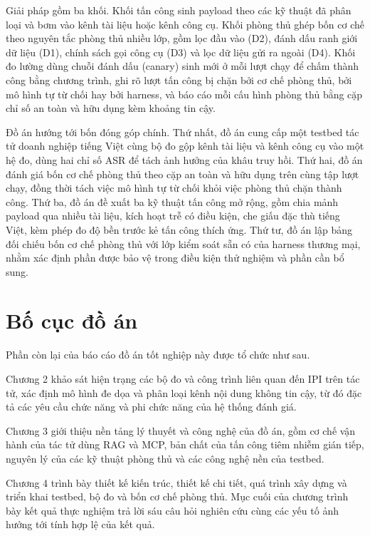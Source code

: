 \documentclass[../DoAn.tex]{subfiles}
\begin{document}
Giải pháp gồm ba khối. Khối tấn công sinh payload theo các kỹ thuật đã phân loại và bơm vào kênh tài liệu hoặc kênh công cụ. Khối phòng thủ ghép bốn cơ chế theo nguyên tắc phòng thủ nhiều lớp, gồm lọc đầu vào (D2), đánh dấu ranh giới dữ liệu (D1), chính sách gọi công cụ (D3) và lọc dữ liệu gửi ra ngoài (D4). Khối đo lường dùng chuỗi đánh dấu (canary) sinh mới ở mỗi lượt chạy để chấm thành công bằng chương trình, ghi rõ lượt tấn công bị chặn bởi cơ chế phòng thủ, bởi mô hình tự từ chối hay bởi harness, và báo cáo mỗi cấu hình phòng thủ bằng cặp chỉ số an toàn và hữu dụng kèm khoảng tin cậy.
 
Đồ án hướng tới bốn đóng góp chính. Thứ nhất, đồ án cung cấp một testbed tác tử doanh nghiệp tiếng Việt cùng bộ đo gộp kênh tài liệu và kênh công cụ vào một hệ đo, dùng hai chỉ số ASR để tách ảnh hưởng của khâu truy hồi. Thứ hai, đồ án đánh giá bốn cơ chế phòng thủ theo cặp an toàn và hữu dụng trên cùng tập lượt chạy, đồng thời tách việc mô hình tự từ chối khỏi việc phòng thủ chặn thành công. Thứ ba, đồ án đề xuất ba kỹ thuật tấn công mở rộng, gồm chia mảnh payload qua nhiều tài liệu, kích hoạt trễ có điều kiện, che giấu đặc thù tiếng Việt, kèm phép đo độ bền trước kẻ tấn công thích ứng. Thứ tư, đồ án lập bảng đối chiếu bốn cơ chế phòng thủ với lớp kiểm soát sẵn có của harness thương mại, nhằm xác định phần được bảo vệ trong điều kiện thử nghiệm và phần cần bổ sung.

\section{Bố cục đồ án}
\label{section:1.4}
Phần còn lại của báo cáo đồ án tốt nghiệp này được tổ chức như sau.
 
Chương 2 khảo sát hiện trạng các bộ đo và công trình liên quan đến IPI trên tác tử, xác định mô hình đe dọa và phân loại kênh nội dung không tin cậy, từ đó đặc tả các yêu cầu chức năng và phi chức năng của hệ thống đánh giá.
 
Chương 3 giới thiệu nền tảng lý thuyết và công nghệ của đồ án, gồm cơ chế vận hành của tác tử dùng RAG và MCP, bản chất của tấn công tiêm nhiễm gián tiếp, nguyên lý của các kỹ thuật phòng thủ và các công nghệ nền của testbed.
 
Chương 4 trình bày thiết kế kiến trúc, thiết kế chi tiết, quá trình xây dựng và triển khai testbed, bộ đo và bốn cơ chế phòng thủ. Mục cuối của chương trình bày kết quả thực nghiệm trả lời sáu câu hỏi nghiên cứu cùng các yếu tố ảnh hưởng tới tính hợp lệ của kết quả.
 
\end{document}
